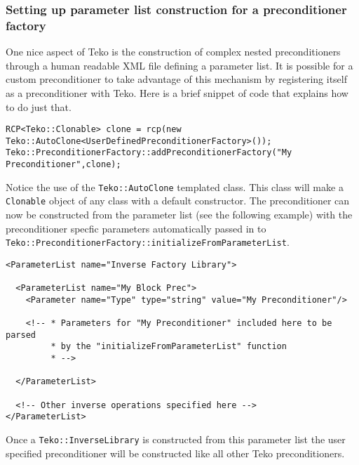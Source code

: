 \documentclass[12pt]{article}
\newcommand{\code}[1]{\lstinline[basicstyle=\footnotesize]!#1!}
\begin{document}
\subsubsection{Setting up parameter list construction for a preconditioner factory}
One nice aspect of Teko is the construction of complex nested preconditioners through
a human readable XML file defining a parameter list. It is possible for a custom
preconditioner to take advantage of this mechanism by registering itself as a preconditioner
with Teko. Here is a brief snippet of code that explains how to do just that.
\begin{framed}
\begin{lstlisting}
RCP<Teko::Clonable> clone = rcp(new Teko::AutoClone<UserDefinedPreconditionerFactory>());
Teko::PreconditionerFactory::addPreconditionerFactory("My Preconditioner",clone);
\end{lstlisting}
\end{framed}
\noindent Notice the use of the \code{Teko::AutoClone} templated class. This class will make a \code{Clonable}
object of any class with a default constructor. The preconditioner can now be constructed
from the parameter list (see the following example) with the preconditioner specfic parameters automatically passed
in to \code{Teko::PreconditionerFactory::initializeFromParameterList}.
\begin{framed}
\begin{lstlisting}
<ParameterList name="Inverse Factory Library">

  <ParameterList name="My Block Prec">
    <Parameter name="Type" type="string" value="My Preconditioner"/>

    <!-- * Parameters for "My Preconditioner" included here to be parsed
         * by the "initializeFromParameterList" function
         * -->

  </ParameterList>

  <!-- Other inverse operations specified here -->
</ParameterList>
\end{lstlisting}
\end{framed}
\noindent Once a \code{Teko::InverseLibrary} is constructed from this parameter list
the user specified preconditioner will be constructed like all other Teko
preconditioners.

\end{document}
